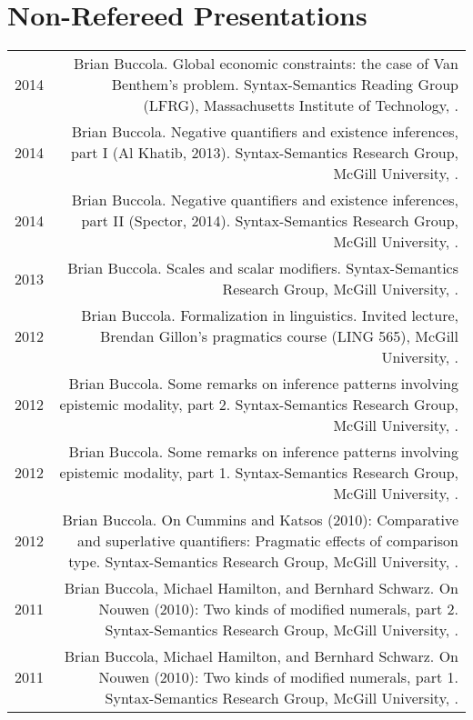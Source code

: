 \documentclass[letterpaper]{article}
\makeatletter
\newcommand{\name}{Brian Buccola}
\newcommand{\myvrule}{\color{lightgray}\vrule width 1.0pt}
\newenvironment{cvsection}{%
  \renewcommand{\arraystretch}{1.75}
  \begin{longtable}[l]{@{} L R @{}}
}{%
  \end{longtable}
}
\makeatother
\begin{document}
\section*{Non-Refereed Presentations}

\begin{cvsection}
  2014 & \name. Global economic constraints: the case of Van Benthem's problem.
  Syntax-Semantics Reading Group (LFRG), Massachusetts Institute of Technology,
  . \\

  2014 & \name. Negative quantifiers and existence inferences, part I (Al
  Khatib, 2013). Syntax-Semantics Research Group, McGill University,
  . \\

  2014 & \name. Negative quantifiers and existence inferences, part II
  (Spector, 2014). Syntax-Semantics Research Group, McGill University,
  . \\

  2013 & \name. Scales and scalar modifiers. Syntax-Semantics Research Group,
  McGill University, . \\

  2012 & \name. Formalization in linguistics.  Invited lecture, Brendan
  Gillon's pragmatics course (LING 565), McGill University,
  . \\

  2012 & \name. Some remarks on inference patterns involving epistemic
  modality, part 2. Syntax-Semantics Research Group, McGill University,
  . \\

  2012 & \name. Some remarks on inference patterns involving epistemic
  modality, part 1. Syntax-Semantics Research Group, McGill University,
  . \\

  2012 & \name. On Cummins and Katsos (2010): Comparative and superlative
  quantifiers: Pragmatic effects of comparison type. Syntax-Semantics Research
  Group, McGill University, . \\

  2011 & \name, Michael Hamilton, and Bernhard Schwarz. On Nouwen (2010): Two
  kinds of modified numerals, part 2. Syntax-Semantics Research Group, McGill
  University, . \\

  2011 & \name, Michael Hamilton, and Bernhard Schwarz. On Nouwen (2010): Two
  kinds of modified numerals, part 1. Syntax-Semantics Research Group, McGill
  University, . \\
\end{cvsection}
\end{document}

